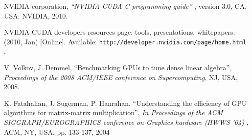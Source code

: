 \documentclass{svmultm}
\begin{document}
\begin{thebibliography}{9999}
 NVIDIA corporation, {\it ``NVIDIA CUDA C programming guide'' }, version 3.0, CA, USA: NVIDIA, 2010.

 NVIDIA CUDA developers resources page: tools, presentations, whitepapers. (2010, Jan) [Online]. Available: {\tt http://developer.nvidia.com/page/home.html }.




 V. Volkov, J. Demmel, ``Benchmarking GPUs to tune dense linear algebra'', {\it Proceedings of the 2008 ACM/IEEE conference on Supercomputing}, NJ, USA, 2008.

 K. Fatahalian, J. Sugerman, P. Hanrahan, ``Understanding the efficiency of GPU algorithms for matrix-matrix multiplication'', {\it In Proceedings of the ACM SIGGRAPH/EUROGRAPHICS conference on Graphics hardware (HWWS '04) }, ACM, NY, USA, pp. 133-137, 2004

\end{thebibliography}


%
%


\end{document}
